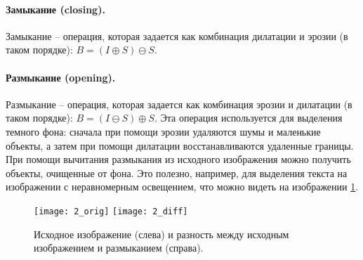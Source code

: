 \paragraph{Замыкание (closing).}

Замыкание -- операция, которая задается как комбинация дилатации и эрозии (в таком порядке): $B = (I \oplus S) \ominus S$.

\paragraph{Размыкание (opening).}

Размыкание -- операция, которая задается как комбинация эрозии и дилатации (в таком порядке): $B = (I \ominus S) \oplus S$. Эта операция используется для выделения темного фона: сначала при помощи эрозии удаляются шумы и маленькие объекты, а затем при помощи дилатации восстанавливаются удаленные границы. При помощи вычитания размыкания из исходного изображения можно получить объекты, очищенные от фона. Это полезно, например, для выделения текста на изображении с неравномерным освещением, что можно видеть на изображении \ref{opening_demo}.

\begin{figure}[!h]
    \centering
    \texttt{[image: 2\_orig]}
    \texttt{[image: 2\_diff]}
    \caption{Исходное изображение (слева) и разность между исходным изображением и размыканием (справа).}
    \label{opening_demo}
\end{figure}

